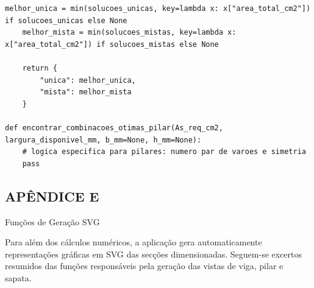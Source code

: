 \begin{lstlisting}[style=PythonStyle, basicstyle=\ttfamily\normalsize, caption={Excerto de armadura\_service.py (Otimização de armaduras)}, label={lst:armadura_service}]
    melhor_unica = min(solucoes_unicas, key=lambda x: x["area_total_cm2"]) if solucoes_unicas else None
    melhor_mista = min(solucoes_mistas, key=lambda x: x["area_total_cm2"]) if solucoes_mistas else None

    return {
        "unica": melhor_unica,
        "mista": melhor_mista
    }

def encontrar_combinacoes_otimas_pilar(As_req_cm2, largura_disponivel_mm, b_mm=None, h_mm=None):
    # logica especifica para pilares: numero par de varoes e simetria
    pass
\end{lstlisting}

\newpage
{}
\begin{center}
\section*{APÊNDICE E}
Funções de Geração SVG
\end{center}

Para além dos cálculos numéricos, a aplicação gera automaticamente representações gráficas em SVG das secções dimensionadas. Seguem-se excertos resumidos das funções responsáveis pela geração das vistas de viga, pilar e sapata.

